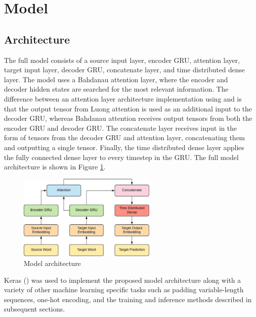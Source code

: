 \section{Model}
\label{sec:3-model}

\subsection{Architecture}
The full model consists of a source input layer, encoder \acrshort{GRU}, attention layer, target input layer, decoder \acrshort{GRU}, concatenate layer, and time distributed dense layer.
The model uses a Bahdanau attention layer, where the encoder and decoder hidden states are searched for the most relevant information. The difference between an attention layer architecture implementation using \cite{bahdanau_neural_2016} and \cite{luong_effective_2015} is that the output tensor from Luong attention is used as an additional input to the decoder \acrshort{GRU}, whereas Bahdanau attention receives output tensors from both the encoder \acrshort{GRU} and decoder \acrshort{GRU}.
The concatenate layer receives input in the form of tensors from the decoder \acrshort{GRU} and attention layer, concatenating them and outputting a single tensor. Finally, the time distributed dense layer applies the fully connected dense layer to every timestep in the \acrshort{GRU}. The full model architecture is shown in Figure \ref{fig:model_diagram}.



\begin{figure}[ht!]
\centering
\includegraphics[width=0.6\textwidth]{media/methodology/model_architecture.jpeg}
\captionsetup{justification=centering}
\caption[Model architecture]{Model architecture}
\label{fig:model_diagram}
\end{figure}

Keras (\cite{keras_2015}) was used to implement the proposed model architecture along with a variety of other machine learning specific tasks such as padding variable-length sequences, one-hot encoding, and the training and inference methods described in subsequent sections.

